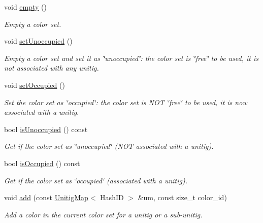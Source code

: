 \begin{DoxyCompactItemize}
\mbox{\label{classColorSet_a868a3bba016715b814d673064652759d}} 
void \hyperlink{classColorSet_a868a3bba016715b814d673064652759d}{empty} ()
\begin{DoxyCompactList}\small\item\em Empty a color set. \end{DoxyCompactList}\item 
\mbox{\label{classColorSet_af9d12aacae9a58f49a6b4cd7b4be8aca}} 
void \hyperlink{classColorSet_af9d12aacae9a58f49a6b4cd7b4be8aca}{set\+Unoccupied} ()
\begin{DoxyCompactList}\small\item\em Empty a color set and set it as \char`\"{}unoccupied\char`\"{}\+: the color set is \char`\"{}free\char`\"{} to be used, it is not associated with any unitig. \end{DoxyCompactList}\item 
\mbox{\label{classColorSet_a74aaaf3dcd059834e2034fd5917db800}} 
void \hyperlink{classColorSet_a74aaaf3dcd059834e2034fd5917db800}{set\+Occupied} ()
\begin{DoxyCompactList}\small\item\em Set the color set as \char`\"{}occupied\char`\"{}\+: the color set is N\+OT \char`\"{}free\char`\"{} to be used, it is now associated with a unitig. \end{DoxyCompactList}\item 
bool \hyperlink{classColorSet_ab8acebbbf6d701ff007fa608432611ef}{is\+Unoccupied} () const
\begin{DoxyCompactList}\small\item\em Get if the color set as \char`\"{}unoccupied\char`\"{} (N\+OT associated with a unitig). \end{DoxyCompactList}\item 
bool \hyperlink{classColorSet_a509c260d1561a341600783c08ff7692e}{is\+Occupied} () const
\begin{DoxyCompactList}\small\item\em Get if the color set as \char`\"{}occupied\char`\"{} (associated with a unitig). \end{DoxyCompactList}\item 
void \hyperlink{classColorSet_a6493a6a007a961aa6ad07ef351792d4d}{add} (const \hyperlink{structUnitigMap}{Unitig\+Map}$<$ Hash\+ID $>$ \&um, const size\+\_\+t color\+\_\+id)
\begin{DoxyCompactList}\small\item\em Add a color in the current color set for a unitig or a sub-\/unitig. \end{DoxyCompactList}\item 

\end{DoxyCompactItemize}
